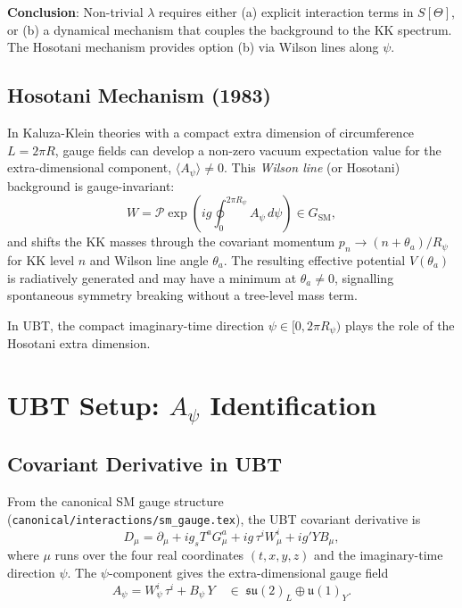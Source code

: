 \documentclass[12pt]{article}
\theoremstyle{definition}
\theoremstyle{remark}
\begin{document}
\textbf{Conclusion}: Non-trivial $\lambda$ requires either (a) explicit
interaction terms in $S[\Theta]$, or (b) a dynamical mechanism that
couples the background to the KK spectrum.  The Hosotani mechanism
provides option (b) via Wilson lines along $\psi$.

\subsection{Hosotani Mechanism (1983)}

In Kaluza-Klein theories with a compact extra dimension of circumference
$L = 2\pi R$, gauge fields can develop a non-zero vacuum expectation value
for the extra-dimensional component, $\langle A_\psi \rangle \neq 0$.
This \emph{Wilson line} (or Hosotani) background is gauge-invariant:
\begin{equation}
  W = \mathcal{P}\exp\!\left(ig \oint_0^{2\pi R_\psi}\!\! A_\psi\,d\psi\right)
  \in G_{\text{SM}},
\end{equation}
and shifts the KK masses through the covariant momentum
$p_n \to (n + \theta_a)/R_\psi$ for KK level $n$ and Wilson line angle
$\theta_a$.  The resulting effective potential $V(\theta_a)$ is
radiatively generated and may have a minimum at $\theta_a \neq 0$,
signalling spontaneous symmetry breaking without a tree-level mass term.

In UBT, the compact imaginary-time direction $\psi \in [0, 2\pi R_\psi)$
plays the role of the Hosotani extra dimension.

\section{UBT Setup: $A_\psi$ Identification}
\label{sec:setup}

\subsection{Covariant Derivative in UBT}

From the canonical SM gauge structure
(\texttt{canonical/interactions/sm\_gauge.tex}), the UBT covariant
derivative is
\begin{equation}
  D_\mu = \partial_\mu + ig_s T^a G^a_\mu + ig\,\tau^i W^i_\mu + ig' Y B_\mu,
\end{equation}
where $\mu$ runs over the four real coordinates $(t, x, y, z)$ and the
imaginary-time direction $\psi$.  The $\psi$-component gives the
extra-dimensional gauge field
\begin{equation}
  A_\psi = W^i_\psi\,\tau^i + B_\psi\,Y
  \quad \in\; \mathfrak{su}(2)_L \oplus \mathfrak{u}(1)_Y.
\end{equation}
\end{document}
